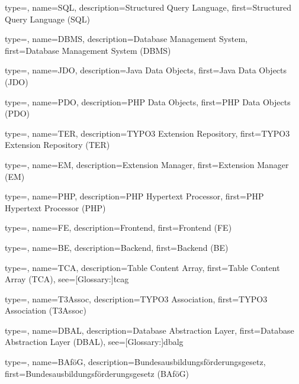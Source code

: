 
{
	type=\acronymtype,
	name={SQL},
	description={Structured Query Language},
	first={Structured Query Language (SQL)}
}

{
	type=\acronymtype,
	name={DBMS},
	description={Database Management System},
	first={Database Management System (DBMS)}
}

{
	type=\acronymtype,
	name={JDO},
	description={Java Data Objects},
	first={Java Data Objects (JDO)}
}

{
	type=\acronymtype,
	name={PDO},
	description={PHP Data Objects},
	first={PHP Data Objects (PDO)}
}

{
	type=\acronymtype,
	name={TER},
	description={TYPO3 Extension Repository},
	first={TYPO3 Extension Repository (TER)}
}

{
	type=\acronymtype,
	name={EM},
	description={Extension Manager},
	first={Extension Manager (EM)}
}

{
	type=\acronymtype,
	name={PHP},
	description={PHP Hypertext Processor},
	first={PHP Hypertext Processor (PHP)}
}

{
	type=\acronymtype,
	name={FE},
	description={Frontend},
	first={Frontend (FE)}
}

{
	type=\acronymtype,
	name={BE},
	description={Backend},
	first={Backend (BE)}
}

{
	type=\acronymtype,
	name={TCA},
	description={Table Content Array},
	first={Table Content Array (TCA)},
	see=[Glossary:]{tcag}
}

{
	type=\acronymtype,
	name={T3Assoc},
	description={TYPO3 Association},
	first={TYPO3 Association (T3Assoc)}
}

{
	type=\acronymtype,
	name={DBAL},
	description={Database Abstraction Layer},
	first={Database Abstraction Layer (DBAL)},
	see=[Glossary:]{dbalg}
}

{
	type=\acronymtype,
	name={BAföG},
	description={Bundesausbildungsförderungsgesetz},
	first={Bundesausbildungsförderungsgesetz (BAföG)}
}

